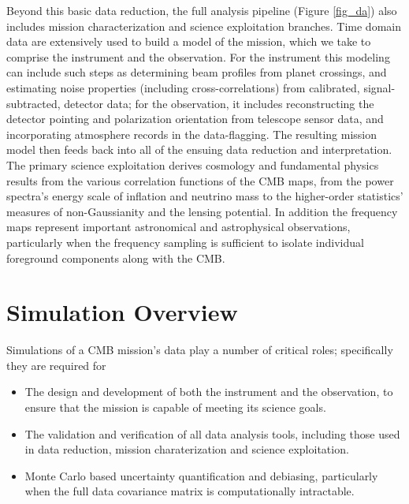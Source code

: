 Beyond this basic data reduction, the full analysis pipeline (Figure \ref{fig_da}) also includes mission characterization and science exploitation branches. Time domain data are extensively used to build a model of the mission, which we take to comprise the instrument and the observation. For the instrument this modeling can include such steps as determining beam profiles from planet crossings, and estimating noise properties (including cross-correlations) from calibrated, signal-subtracted, detector data; for the observation, it includes reconstructing the detector pointing and polarization orientation from telescope sensor data, and incorporating atmosphere records in the data-flagging. The resulting mission model then feeds back into all of the ensuing data reduction and interpretation. The primary science exploitation derives cosmology and fundamental physics results from the various correlation functions of the CMB maps, from the power spectra's energy scale of inflation and neutrino mass to the higher-order statistics'  measures of non-Gaussianity and the lensing potential. In addition the frequency maps represent important astronomical and astrophysical observations, particularly when the frequency sampling is sufficient to isolate individual foreground components along with the CMB. 

\newpage



\newpage



\newpage



\newpage

\section{Simulation Overview}
Simulations of a CMB mission's data play a number of critical roles; specifically they are required for
\begin{itemize}
\item The design and development of both the instrument and the observation, to ensure that the mission is capable of meeting its science goals.
\item The validation and verification of all data analysis tools, including those used in data reduction, mission charaterization and science exploitation.
\item Monte Carlo based uncertainty quantification and debiasing, particularly when the full data covariance matrix is computationally intractable.
\end{itemize}

